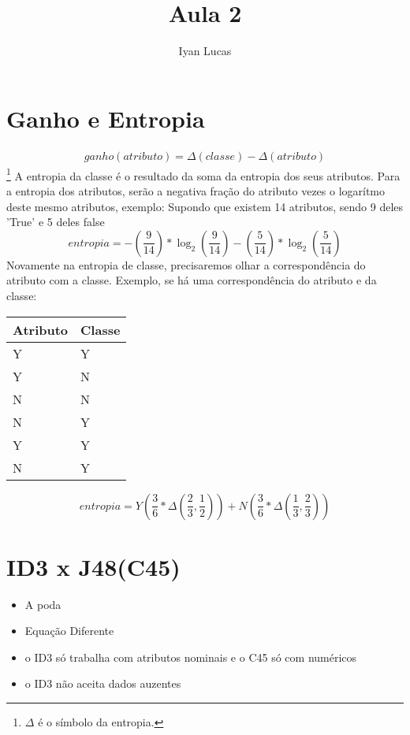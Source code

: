 \documentclass[oneside]{article}            %
\title{Aula 2}
\author{Iyan Lucas}
\begin{document}
    \maketitle

    \section{Ganho e Entropia}
    \begin{eqnarray}
        ganho(atributo) = \Delta(classe) - \Delta(atributo)
    \end{eqnarray}\footnote{$\Delta$ é o símbolo da entropia.}
    A entropia da classe é o resultado da soma da entropia dos seus atributos.
    Para a entropia dos atributos, serão a negativa fração do atributo vezes o logarítmo deste mesmo atributos, exemplo:
    Supondo que existem 14 atributos, sendo 9 deles 'True' e 5 deles false
    \begin{equation}
        entropia = -(\frac{9}{14}) * \log_2(\frac{9}{14}) - (\frac{5}{14}) * \log_2(\frac{5}{14})
    \end{equation}
    Novamente na entropia de classe, precisaremos olhar a correspondência do atributo com a classe.
    Exemplo, se há uma correspondência do atributo e da classe:
    \begin{table}[h]
        \begin{tabular}{|l|l|}
        \hline
        Atributo & Classe \\ \hline
        Y        & Y      \\ \hline
        Y        & N      \\ \hline
        N        & N      \\ \hline
        N        & Y      \\ \hline
        Y        & Y      \\ \hline
        N        & Y      \\ \hline
        \end{tabular}
        \end{table}
        \begin{equation}
            entropia = Y(\frac{3}{6}*\Delta(\frac{2}{3}, \frac{1}{2})) + N(\frac{3}{6}*\Delta(\frac{1}{3}, \frac{2}{3}))
        \end{equation}
    \section{ID3 x J48(C45)}
    \begin{itemize}
        \item A poda
        \item Equação Diferente
        \item o ID3 só trabalha com atributos nominais e o C45 só com numéricos
        \item o ID3 não aceita dados auzentes
    \end{itemize}
\end{document}
